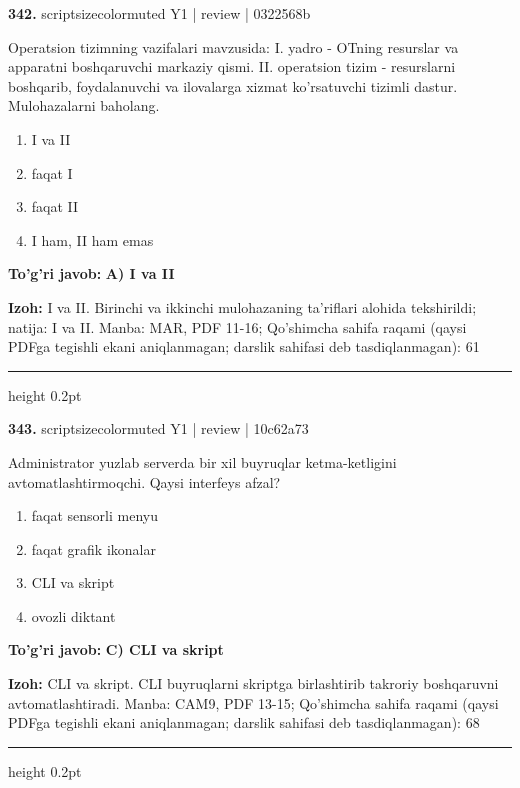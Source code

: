 \documentclass[10pt,a4paper]{article}
\begin{document}
{\bfseries\sffamily\color{ink} 342.} {scriptsizecolor{muted} Y1 | review | 0322568b}
\par
Operatsion tizimning vazifalari mavzusida: I. yadro - OTning resurslar va apparatni boshqaruvchi markaziy qismi. II. operatsion tizim - resurslarni boshqarib, foydalanuvchi va ilovalarga xizmat ko'rsatuvchi tizimli dastur. Mulohazalarni baholang.
\begin{enumerate}[label=\Alph*),leftmargin=9mm]
\item I va II
\item faqat I
\item faqat II
\item I ham, II ham emas
\end{enumerate}
\begin{tcolorbox}[enhanced,breakable,colback=teal!4,colframe=teal!60!black,boxrule=0.45pt,arc=1.2mm,left=2.7mm,right=2.7mm,top=1.8mm,bottom=1.8mm,before skip=2mm,after skip=2mm]
{\bfseries\sffamily\color{teal}To'g'ri javob:} \textbf{A) I va II}
\par\smallskip
{\bfseries Izoh:} I va II. Birinchi va ikkinchi mulohazaning ta'riflari alohida tekshirildi; natija: I va II. Manba: MAR, PDF 11-16; Qo'shimcha sahifa raqami (qaysi PDFga tegishli ekani aniqlanmagan; darslik sahifasi deb tasdiqlanmagan): 61
\end{tcolorbox}
\vspace{2mm}\hrule height 0.2pt\vspace{3mm}

{\bfseries\sffamily\color{ink} 343.} {scriptsizecolor{muted} Y1 | review | 10c62a73}
\par
Administrator yuzlab serverda bir xil buyruqlar ketma-ketligini avtomatlashtirmoqchi. Qaysi interfeys afzal?
\begin{enumerate}[label=\Alph*),leftmargin=9mm]
\item faqat sensorli menyu
\item faqat grafik ikonalar
\item CLI va skript
\item ovozli diktant
\end{enumerate}
\begin{tcolorbox}[enhanced,breakable,colback=teal!4,colframe=teal!60!black,boxrule=0.45pt,arc=1.2mm,left=2.7mm,right=2.7mm,top=1.8mm,bottom=1.8mm,before skip=2mm,after skip=2mm]
{\bfseries\sffamily\color{teal}To'g'ri javob:} \textbf{C) CLI va skript}
\par\smallskip
{\bfseries Izoh:} CLI va skript. CLI buyruqlarni skriptga birlashtirib takroriy boshqaruvni avtomatlashtiradi. Manba: CAM9, PDF 13-15; Qo'shimcha sahifa raqami (qaysi PDFga tegishli ekani aniqlanmagan; darslik sahifasi deb tasdiqlanmagan): 68
\end{tcolorbox}
\vspace{2mm}\hrule height 0.2pt\vspace{3mm}
\end{document}
